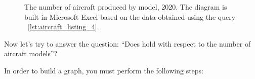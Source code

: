 \begin{figure*}[h]

    \setlength{\fboxsep}{0pt}%
    \setlength{\fboxrule}{1pt}%

	\caption[Number of aircraft produced by model, 2020.]{The number of aircraft produced by model, 2020. The diagram is built in Microsoft Excel based on the data obtained using the query ~\protect\ref{lst:aircraft_listing_4}.}%
    \label{fig:Number_of_aircraft_produced_en_2020}%
\end{figure*}

Now let's try to answer the question: ``Does  hold with respect to the 
number of aircraft models''?

In order to build a graph, you must perform the following steps:

